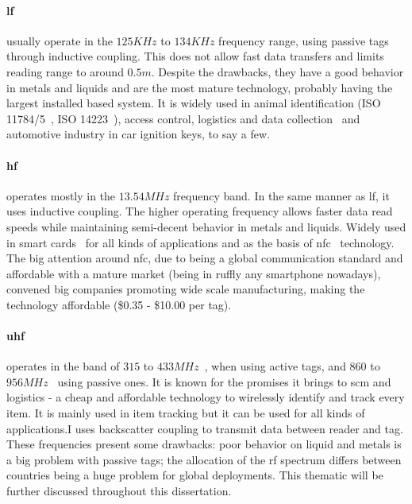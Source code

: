 \paragraph*{\ac{lf}} usually operate in the $125KHz$ to $134KHz$ frequency range, using passive tags through inductive coupling. This does not allow fast data transfers and limits reading range to around $0.5m$. Despite the drawbacks, they have a good behavior in metals and liquids and are the most mature technology, probably having the largest installed based system.
It is widely used in animal identification (ISO 11784/5~\cite{isoISO117841996, isoISO117851996}, ISO 14223~\cite{isoISO1422332018}), access control, logistics and data collection~\cite{isoISOIEC180002} and automotive industry in car ignition keys, to say a few.

\paragraph*{\ac{hf}} operates mostly in the $13.54MHz$ frequency band. In the same manner as \ac{lf}, it uses inductive coupling. The higher operating frequency allows faster data read speeds while maintaining semi-decent behavior in metals and liquids.
Widely used in smart cards~\cite{isoISOIEC156932, MIFARE} for all kinds of applications and as the basis of \ac{nfc}~\cite{isoISOIEC144434, isoISOIEC180003} technology. The big attention around \ac{nfc}, due to being a global communication standard and affordable with a mature market (being in ruffly any smartphone nowadays), convened big companies promoting wide scale manufacturing, making the technology affordable (\$0.35 - \$10.00 per tag).

\paragraph*{\ac{uhf}} operates in the band of $315$ to $433MHz$~\cite{isoISOIEC180007}, when using active tags, and $860$ to $956MHz$~\cite{isoISOIEC180006} using passive ones. It is known for the promises it brings to \ac{scm} and logistics - a cheap and affordable technology to wirelessly identify and track every item. It is mainly used in item tracking but it can be used for all kinds of applications.I uses backscatter coupling to transmit data between reader and tag. These frequencies present some drawbacks: poor behavior on liquid and metals is a big problem with passive tags; the allocation of the \ac{rf} spectrum differs between countries being a huge problem for global deployments. This thematic will be further discussed throughout this dissertation.


